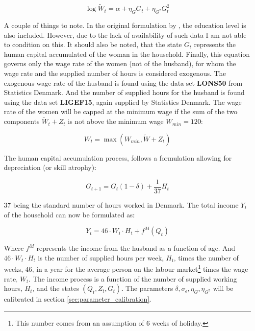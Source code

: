\begin{equation}
    \log \tilde{W}_t = \alpha + \eta_G G_t + \eta_{G^2} G_t^2
\end{equation}

A couple of things to note. In the original formulation by \textcite{lemieux_mincer_2006}, the education level is also included. However, due to the lack of availability of such data I am not able to condition on this. It should also be noted, that the state $G_t$ represents the human capital accumulated of the woman in the household. Finally, this equation governs only the wage rate of the women (not of the husband), for whom the wage rate and the supplied number of hours is considered exogenous. The exogenous wage rate of the husband is found using the data set \textbf{LONS50} from Statistics Denmark. And the number of supplied hours for the husband is found using the data set \textbf{LIGEF15}, again supplied by Statistics Denmark. The wage rate of the women will be capped at the minimum wage if the sum of the two components $\tilde{W}_t + Z_t$ is not above the minimum wage $W_{min} = 120$: 

\begin{equation}
    W_t = \max ( W_{min}, \tilde{W} + Z_t)
\end{equation}

The human capital accumulation process, follows a formulation allowing for depreciation (or skill atrophy):

\begin{equation}
    G_{t+1} = G_t (1-\delta)  + \frac{1}{37} H_t 
\end{equation}

37 being the standard number of hours worked in Denmark. The total income $Y_t$ of the household can now be formulated as:

\begin{equation}
    Y_t = 46 \cdot W_t \cdot H_t + f^M(Q_t)
\end{equation}

Where $f^M$ represents the income from the husband as a function of age. And $46 \cdot W_t \cdot H_t$ is the number of supplied hours per week, $H_t$, times the number of weeks, 46, in a year for the average person on the labour market\footnote{This number comes from an assumption of 6 weeks of holiday.} times the wage rate, $W_t$. The income process is a function of the number of supplied working hours, $H_t$, and the states $(Q_t, Z_t, G_t)$. The parameters $\delta, \sigma_\epsilon, \eta_G, \eta_{G^{2}}$ will be calibrated in section \ref{sec:parameter_calibration}.

